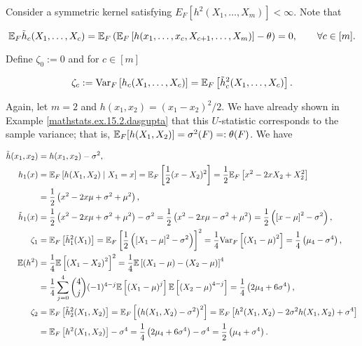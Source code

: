 \begin{definition}

Consider a symmetric kernel satisfying \(E_F[ h^2(X_1, \ldots, X_m)] < \infty\). Note that 

\[
\E_F \tilde{h}_c(X_1, \ldots, X_c) = \E_F \left( \E_F \left[ h(x_1, \ldots, x_c, X_{c+1}, \ldots, X_m) \right] - \theta \right)  = 0, \qquad \forall c \in [m].
\]

Define \(\zeta_0 := 0\) and for \(c \in [m]\)

\[
\zeta_c := \Var_F \left[ h_c(X_1, \ldots, X_c) \right] = \E_F \left[ \tilde{h}_c^2(X_1, \ldots, X_c) \right].
\]

\end{definition}

\begin{example}

Again, let \(m=2\) and \(h(x_1, x_2) = (x_1 -x_2)^2/2\). We have already shown in Example \ref{mathstats.ex.15.2.dasgupta} that this \(U\)-statistic corresponds to the sample variance; that is, \( \E_F[h(X_1, X_2)] = \sigma^2(F) =: \theta(F)\). We have

\begin{align*}
\tilde{h}(x_1, x_2) & = h(x_1, x_2) - \sigma^2,
\\ h_1(x) & = \E_F \left[ h(X_1, X_2 )  \mid X_1 = x \right]= \E_F \left[\frac{1}{2}(x - X_2)^2 \right]  = \frac{1}{2}\E_F \left[x^2 - 2xX_2 + X_2^2 \right] 
\\ & = \frac{1}{2}\left(x^2 - 2x\mu + \sigma^2 + \mu^2 \right),
\\ \tilde{h}_1(x) & =\frac{1}{2}\left(x^2 - 2x\mu + \sigma^2 + \mu^2 \right) - \sigma^2 = \frac{1}{2}\left(x^2 - 2x\mu - \sigma^2 + \mu^2 \right) = \frac{1}{2}\left(\left[x - \mu\right]^2 - \sigma^2 \right) ,
\\ \zeta_1 & =\E_F \left[ \tilde{h}_1^2(X_1) \right] =\E_F \left[ \frac{1}{2}\left(\left[X_1 - \mu\right]^2 - \sigma^2 \right)\right]^2 = \frac{1}{4} \Var_F \left[ \left( X_1 - \mu \right)^2 \right] = \frac{1}{4}\left(\mu_4 - \sigma^4\right),
\\ \E (h^2) & = \frac{1}{4}\E \left[ \left(X_1- X_2\right)^2 \right]^2  = \frac{1}{4}\E \left[ \left(X_1 - \mu\right) -\left( X_2 - \mu \right) \right]^4
\\  &= \frac{1}{4}\sum_{j=0}^4 \binom{4}{j} (-1)^{4-j} \E \left[ \left(X_1 - \mu\right)^j \right] \E \left[ \left( X_2 - \mu \right)^{4-j} \right]
 = \frac{1}{4}\left(2 \mu_4 + 6 \sigma^4 \right),
\\ \zeta_2 & =  \E_F \left[ \tilde{h}_2^2(X_1, X_2) \right]   =  \E_F \left[ \left(h(X_1, X_2) - \sigma^2 \right)^2 \right] =  \E_F \left[ h^2(X_1, X_2) - 2 \sigma^2 h(X_1, X_2)  + \sigma^4 \right]
\\&  =  \E_F \left[ h^2(X_1, X_2) \right]  - \sigma^4 =  \frac{1}{4}\left(2 \mu_4 + 6 \sigma^4 \right)  - \sigma^4 = \frac{1}{2} \left( \mu_4 + \sigma^4\right).
\end{align*} 

\end{example}

